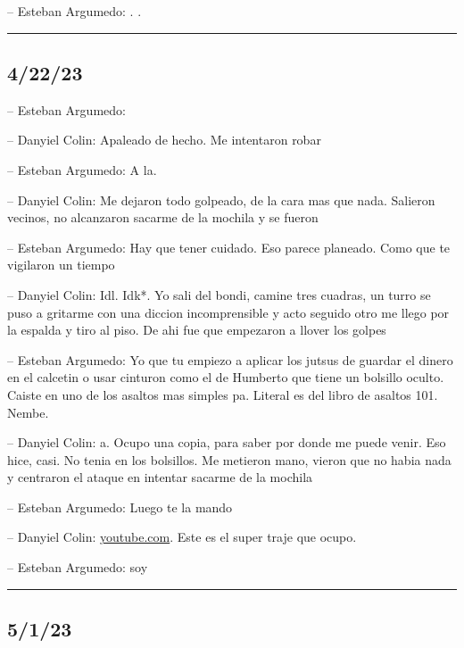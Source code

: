 -- Esteban Argumedo: . .

\begin{center}\rule{0.5\linewidth}{0.5pt}\end{center}

\hypertarget{section-196}{%
\subsection{4/22/23}\label{section-196}}

-- Esteban Argumedo:

-- Danyiel Colin: Apaleado de hecho. Me intentaron robar

-- Esteban Argumedo: A la.

-- Danyiel Colin: Me dejaron todo golpeado, de la cara mas que nada.
Salieron vecinos, no alcanzaron sacarme de la mochila y se fueron

-- Esteban Argumedo: Hay que tener cuidado. Eso parece planeado. Como
que te vigilaron un tiempo

-- Danyiel Colin: Idl. Idk*. Yo sali del bondi, camine tres cuadras, un
turro se puso a gritarme con una diccion incomprensible y acto seguido
otro me llego por la espalda y tiro al piso. De ahi fue que empezaron a
llover los golpes

-- Esteban Argumedo: Yo que tu empiezo a aplicar los jutsus de guardar
el dinero en el calcetin o usar cinturon como el de Humberto que tiene
un bolsillo oculto. Caiste en uno de los asaltos mas simples pa. Literal
es del libro de asaltos 101. Nembe.

-- Danyiel Colin: a. Ocupo una copia, para saber por donde me puede
venir. Eso hice, casi. No tenia en los bolsillos. Me metieron mano,
vieron que no habia nada y centraron el ataque en intentar sacarme de la
mochila

-- Esteban Argumedo: Luego te la mando

-- Danyiel Colin:
\href{https://youtube.com/shorts/q3gvl1UiO4U?feature=share}{youtube.com}.
Este es el super traje que ocupo.

-- Esteban Argumedo: soy

\begin{center}\rule{0.5\linewidth}{0.5pt}\end{center}

\hypertarget{section-197}{%
\subsection{5/1/23}\label{section-197}}

